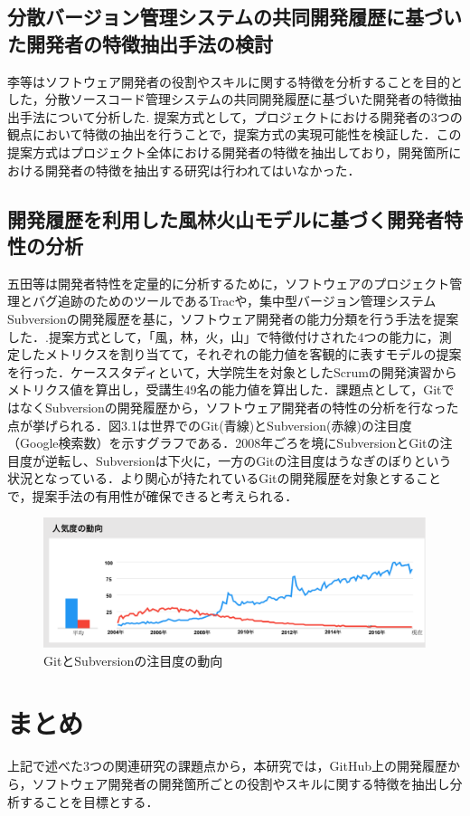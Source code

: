 \documentclass{funthesis}
\begin{document}
\subsection{分散バージョン管理システムの共同開発履歴に基づいた開発者の特徴抽出手法の検討}
李等はソフトウェア開発者の役割やスキルに関する特徴を分析することを目的とした，分散ソースコード管理システムの共同開発履歴に基づいた開発者の特徴抽出手法について分析した\cite{risyo}. 提案方式として，プロジェクトにおける開発者の3つの観点において特徴の抽出を行うことで，提案方式の実現可能性を検証した．この提案方式はプロジェクト全体における開発者の特徴を抽出しており，開発箇所における開発者の特徴を抽出する研究は行われてはいなかった．
\subsection{開発履歴を利用した風林火山モデルに基づく開発者特性の分析}
五田等は開発者特性を定量的に分析するために，ソフトウェアのプロジェクト管理とバグ追跡のためのツールであるTracや，集中型バージョン管理システムSubversionの開発履歴を基に，ソフトウェア開発者の能力分類を行う手法を提案した．\cite{gota}.提案方式として，「風，林，火，山」で特徴付けされた4つの能力に，測定したメトリクスを割り当てて，それぞれの能力値を客観的に表すモデルの提案を行った．ケーススタディといて，大学院生を対象としたScrumの開発演習からメトリクス値を算出し，受講生49名の能力値を算出した．課題点として，GitではなくSubversionの開発履歴から，ソフトウェア開発者の特性の分析を行なった点が挙げられる．図3.1は世界でのGit(青線)とSubversion(赤線)の注目度（Google検索数）を示すグラフである\cite{google_trends}．2008年ごろを境にSubversionとGitの注目度が逆転し、Subversionは下火に，一方のGitの注目度はうなぎのぼりという状況となっている．より関心が持たれているGitの開発履歴を対象とすることで，提案手法の有用性が確保できると考えられる．
\begin{figure}[H]
\centering  %
\includegraphics[clip,width=14cm]{figures/git_subversion.pdf}
  \caption{GitとSubversionの注目度の動向}    \label{sample}
\end{figure}
\section{まとめ}
上記で述べた3つの関連研究の課題点から，本研究では，GitHub上の開発履歴から，ソフトウェア開発者の開発箇所ごとの役割やスキルに関する特徴を抽出し分析することを目標とする．
\end{document}
